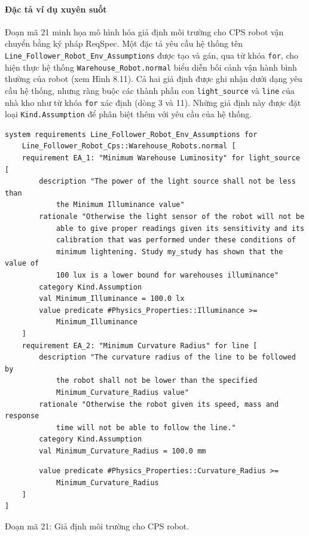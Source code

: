 \paragraph{Đặc tả ví dụ xuyên suốt}
Đoạn mã 21 minh họa mô hình hóa giả định môi trường cho CPS robot vận chuyển bằng ký pháp ReqSpec. Một đặc tả yêu cầu hệ thống tên \texttt{Line\_Follower\_Robot\_Env\_Assumptions} được tạo và gán, qua từ khóa \texttt{for}, cho hiện thực hệ thống \texttt{Warehouse\_Robot.normal} biểu diễn bối cảnh vận hành bình thường của robot (xem Hình 8.11). Cả hai giả định được ghi nhận dưới dạng yêu cầu hệ thống, nhưng ràng buộc các thành phần con \texttt{light\_source} và \texttt{line} của nhà kho như từ khóa \texttt{for} xác định (dòng 3 và 11). Những giả định này được đặt loại \texttt{Kind.Assumption} để phân biệt thêm với yêu cầu của hệ thống.
\begin{verbatim}
system requirements Line_Follower_Robot_Env_Assumptions for
    Line_Follower_Robot_Cps::Warehouse_Robots.normal [
    requirement EA_1: "Minimum Warehouse Luminosity" for light_source [
        description "The power of the light source shall not be less than
            the Minimum Illuminance value"
        rationale "Otherwise the light sensor of the robot will not be
            able to give proper readings given its sensitivity and its
            calibration that was performed under these conditions of
            minimum lightening. Study my_study has shown that the value of
            100 lux is a lower bound for warehouses illuminance"
        category Kind.Assumption
        val Minimum_Illuminance = 100.0 lx
        value predicate #Physics_Properties::Illuminance >=
            Minimum_Illuminance
    ]
    requirement EA_2: "Minimum Curvature Radius" for line [
        description "The curvature radius of the line to be followed by
            the robot shall not be lower than the specified
            Minimum_Curvature_Radius value"
        rationale "Otherwise the robot given its speed, mass and response
            time will not be able to follow the line."
        category Kind.Assumption
        val Minimum_Curvature_Radius = 100.0 mm
\end{verbatim}
\begin{verbatim}
        value predicate #Physics_Properties::Curvature_Radius >=
            Minimum_Curvature_Radius
    ]
]
\end{verbatim}
\begin{center}\small Đoạn mã 21: Giả định môi trường cho CPS robot.\end{center}


